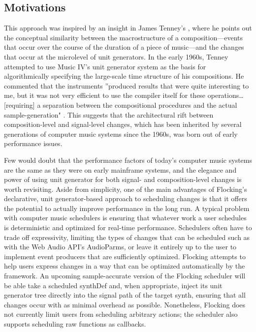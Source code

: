 \documentclass{article}
\begin{document}
\subsection{Motivations}

This approach was inspired by an insight in James Tenney's \cite{tenney1969computer}, where he points out the conceptual similarity between the macrostructure of a composition---events that occur over the course of the duration of a piece of music---and the changes that occur at the microlevel of unit generators. In the early 1960s, Tenney attempted to use Music IV's unit generator system as the basis for algorithmically specifying the large-scale time structure of his compositions. He commented that the instruments ''produced results that were quite interesting to me, but it was not very efficient to use the compiler itself for these operations\ldots [requiring] a separation between the compositional procedures and the actual sample-generation" \cite[p.41--42]{tenney1969computer}. This suggests that the architectural rift between composition-level and signal-level changes, which has been inherited by several generations of computer music systems since the 1960s, was born out of early performance issues.

Few would doubt that the performance factors of today's computer music systems are the same as they were on early mainframe systems, and the elegance and power of using unit generator for both signal- and composition-level changes is worth revisiting. Aside from simplicity, one of the main advantages of Flocking's declarative, unit generator-based approach to scheduling changes is that it offers the potential to actually improve performance in the long run. A typical problem with computer music schedulers is ensuring that whatever work a user schedules is deterministic and optimized for real-time performance. Schedulers often have to trade off expressivity, limiting the types of changes that can be scheduled such as with the Web Audio API's AudioParms, or leave it entirely up to the user to implement event producers that are sufficiently optimized. Flocking attempts to help users express changes in a way that can be optimized automatically by the framework. An upcoming sample-accurate version of the Flocking scheduler will be able take a scheduled synthDef and, when appropriate, inject its unit generator tree directly into the signal path of the target synth, ensuring that all changes occur with as minimal overhead as possible. Nonetheless, Flocking does not currently limit users from scheduling arbitrary actions; the scheduler also supports scheduling raw functions as callbacks.
\end{document}
